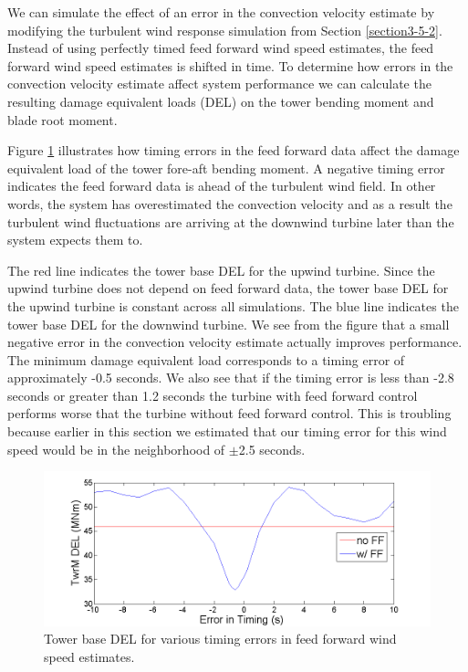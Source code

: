 We can simulate the effect of an error in the convection velocity estimate by modifying the turbulent wind response simulation from Section \ref{section3-5-2}. Instead of using perfectly timed feed forward wind speed estimates, the feed forward wind speed estimates is shifted in time. To determine how errors in the convection velocity estimate affect system performance we can calculate the resulting damage equivalent loads (DEL) on the tower bending moment and blade root moment.

Figure \ref{fig3-36} illustrates how timing errors in the feed forward data affect the damage equivalent load of the tower fore-aft bending moment. A negative timing error indicates the feed forward data is ahead of the turbulent wind field. In other words, the system has overestimated the convection velocity and as a result the turbulent wind fluctuations are arriving at the downwind turbine later than the system expects them to. 

The red line indicates the tower base DEL for the upwind turbine. Since the upwind turbine does not depend on feed forward data, the tower base DEL for the upwind turbine is constant across all simulations. The blue line indicates the tower base DEL for the downwind turbine. We see from the figure that a small negative error in the convection velocity estimate actually improves performance. The minimum damage equivalent load corresponds to a timing error of approximately -0.5 seconds. We also see that if the timing error is less than -2.8 seconds or greater than 1.2 seconds the turbine with feed forward control performs worse that the turbine without feed forward control. This is troubling because earlier in this section we estimated that our timing error for this wind speed would be in the neighborhood of $\pm$2.5 seconds.

\begin{figure}[htb]
	\centering
		\includegraphics[width = \linewidth]{Figures/ch3Figures/fig3-36.png}
	\caption{Tower base DEL for various timing errors in feed forward wind speed estimates.}
	\label{fig3-36}
\end{figure}

